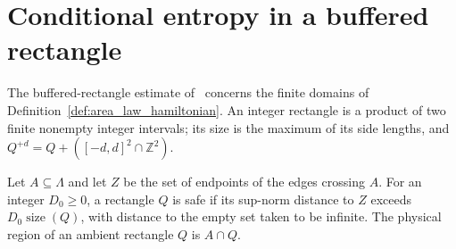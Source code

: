 \section{Conditional entropy in a buffered rectangle}
\label{sec:area_law_initial_buffer}

The buffered-rectangle estimate of~\cite[Lemma~3.2]{OpenAI2026AreaLaw} concerns
the finite domains of Definition~\ref{def:area_law_hamiltonian}. An integer rectangle is a product
of two finite nonempty integer intervals; its size is the maximum of its side
lengths, and $Q^{+d}=Q+([-d,d]^2\cap\mathbb Z^2)$.

\begin{definition}
    \label{def:area_law_safe_rectangle}
    \leanok
    Let $A\subseteq\Lambda$ and let $Z$ be the set of endpoints of the edges
    crossing $A$. For an integer $D_0\ge0$, a rectangle $Q$ is safe if its sup-norm
    distance to $Z$ exceeds $D_0\operatorname{size}(Q)$, with distance to the empty
    set taken to be infinite. The physical region of
    an ambient rectangle $Q$ is $A\cap Q$.
\end{definition}

